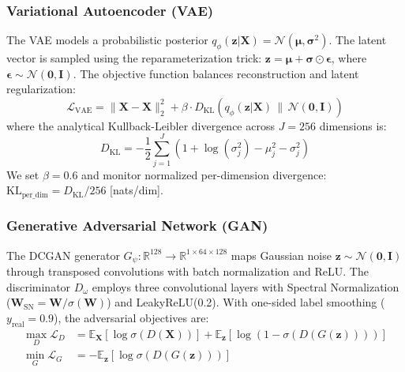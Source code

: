 \documentclass[conference]{IEEEtran}
\begin{document}
\subsubsection{Variational Autoencoder (VAE)}
The VAE models a probabilistic posterior $q_\phi(\mathbf{z}|\mathbf{X}) = \mathcal{N}(\boldsymbol{\mu}, \boldsymbol{\sigma}^2)$. The latent vector is sampled using the reparameterization trick: $\mathbf{z} = \boldsymbol{\mu} + \boldsymbol{\sigma} \odot \boldsymbol{\epsilon}$, where $\boldsymbol{\epsilon} \sim \mathcal{N}(\mathbf{0}, \mathbf{I})$. The objective function balances reconstruction and latent regularization:
\begin{equation}
\mathcal{L}_{\text{VAE}} = \|\mathbf{X} - \hat{\mathbf{X}}\|_2^2 + \beta \cdot D_{\text{KL}}\left( q_\phi(\mathbf{z}|\mathbf{X}) \,\|\, \mathcal{N}(\mathbf{0}, \mathbf{I}) \right)
\label{eq:vae_loss}
\end{equation}
where the analytical Kullback-Leibler divergence across $J = 256$ dimensions is:
\begin{equation}
D_{\text{KL}} = -\frac{1}{2} \sum_{j=1}^J \left( 1 + \log(\sigma_j^2) - \mu_j^2 - \sigma_j^2 \right)
\end{equation}
We set $\beta = 0.6$ and monitor normalized per-dimension divergence: $\text{KL}_{\text{per\_dim}} = D_{\text{KL}} / 256$ [nats/dim].

\subsubsection{Generative Adversarial Network (GAN)}
The DCGAN generator $G_\psi: \mathbb{R}^{128} \to \mathbb{R}^{1 \times 64 \times 128}$ maps Gaussian noise $\mathbf{z} \sim \mathcal{N}(\mathbf{0}, \mathbf{I})$ through transposed convolutions with batch normalization and ReLU. The discriminator $D_\omega$ employs three convolutional layers with Spectral Normalization ($\mathbf{W}_{\text{SN}} = \mathbf{W} / \sigma(\mathbf{W})$) and LeakyReLU(0.2). With one-sided label smoothing ($y_{\text{real}} = 0.9$), the adversarial objectives are:
\begin{align}
\max_D \mathcal{L}_D &= \mathbb{E}_{\mathbf{X}} [\log \sigma(D(\mathbf{X}))] + \mathbb{E}_{\mathbf{z}} [\log (1 - \sigma(D(G(\mathbf{z}))))] \\
\min_G \mathcal{L}_G &= -\mathbb{E}_{\mathbf{z}} [\log \sigma(D(G(\mathbf{z})))]
\end{align}
\end{document}
